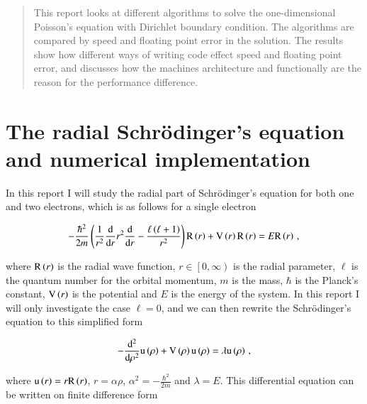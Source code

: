 \documentclass[11pt,english,a4paper]{article}
\begin{document}
\maketitle
\begin{flushleft}

\begin{abstract}
This report looks at different algorithms to solve the one-dimensional Poisson's equation with Dirichlet boundary condition. The algorithms are compared by speed and floating point error in the solution. The results show how different ways of writing code effect speed and floating point error, and discusses how the machines architecture and functionally are the reason for the performance difference.
\end{abstract}

\section{The radial Schr\"{o}dinger's equation and numerical implementation}

In this report I will study the radial part of Schr\"{o}dinger's equation for both one and two electrons, which is as follows for a single electron

\begin{align*}
-\frac{\hbar^2}{2m}\left({\frac{1}{r^2} \frac{\mathrm{d}}{\mathrm{d}r}r^2\frac{\mathrm{d}}{\mathrm{d}r}-\frac{\ell\left({\ell+1}\right)}{r^2}}\right)\mathrm{R}\left({r}\right)+\mathrm{V}\left({r}\right)\mathrm{R}\left({r}\right) = E \mathrm{R}\left({r}\right) \,,
\end{align*}

where $\mathrm{R}\left({r}\right)$ is the radial wave function, $r\in\left[0,\infty\right)$ is the radial parameter, $\ell$ is the quantum number for the orbital momentum, $m$ is the mass, $\hbar$ is the Planck's constant, $\mathrm{V}\left({r}\right)$ is the potential and $E$ is the energy of the system. In this report I will only investigate the case $\ell = 0$, and we can then rewrite the Schr\"{o}dinger's equation to this simplified form

\begin{align}
-\frac{\mathrm{d}^2}{\mathrm{d}\rho^2}\mathrm{u}\left({\rho}\right) + \mathrm{V}\left({\rho}\right)\mathrm{u}\left({\rho}\right) = \lambda\mathrm{u}\left({\rho}\right) \,,
\label{eq_1}
\end{align}

where $\mathrm{u}\left({r}\right) = r \mathrm{R}\left({r}\right)$, $r = \alpha \rho$, $\alpha^2 = - \frac{\hbar^2}{2m}$ and $\lambda = E$. This differential equation can be written on finite difference form


\end{flushleft}
\end{document}
